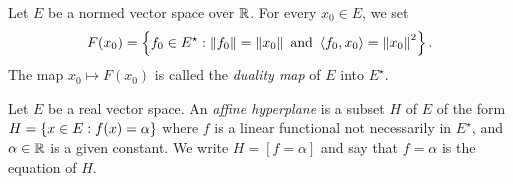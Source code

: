 \documentclass[11pt]{article}
\begin{document}
\begin{definition}
    Let $E$ be a normed vector space over $\mathbb{R}$. For every $x_0\in E$, we set 
    \begin{equation*}
        F(x_0) = \left\{f_0\in E^\star : \left\lVert f_0\right\rVert = \left\lVert x_0\right\rVert \text{ and } \left\langle f_0, x_0\right\rangle = \left\lVert x_0\right\rVert^2\right\}.
    \end{equation*}
    The map $x_0\mapsto F(x_0)$ is called the \textit{duality map} of $E$ into $E^\star$.
\end{definition}

\begin{definition}
    Let $E$ be a real vector space. An \textit{affine hyperplane} is a subset $H$ of $E$ of the form $H= \left\{x\in E : f(x) = \alpha\right\}$ where $f$ is a linear functional not necessarily in $E^\star$, and $\alpha \in \mathbb{R}$ is a given constant.  We write $H=[f=\alpha]$ and say that $f=\alpha$ is the equation of $H$.
\end{definition}
\end{document}
